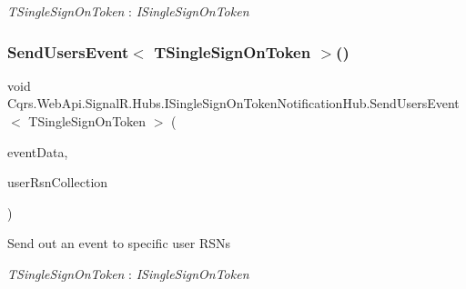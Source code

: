 \begin{Desc}
\item[Type Constraints]\begin{description}
\item[{\em T\+Single\+Sign\+On\+Token} : {\em I\+Single\+Sign\+On\+Token}]\end{description}
\end{Desc}
\mbox{\label{interfaceCqrs_1_1WebApi_1_1SignalR_1_1Hubs_1_1ISingleSignOnTokenNotificationHub_afe5b9561d3844b33e63082420666823e_afe5b9561d3844b33e63082420666823e}} 
\subsubsection{\texorpdfstring{Send\+Users\+Event$<$ T\+Single\+Sign\+On\+Token $>$()}{SendUsersEvent< TSingleSignOnToken >()}}
{\footnotesize\ttfamily void Cqrs.\+Web\+Api.\+Signal\+R.\+Hubs.\+I\+Single\+Sign\+On\+Token\+Notification\+Hub.\+Send\+Users\+Event$<$ T\+Single\+Sign\+On\+Token $>$ (\begin{DoxyParamCaption}\item[{\hyperlink{interfaceCqrs_1_1Events_1_1IEvent}{I\+Event}$<$ T\+Single\+Sign\+On\+Token $>$}]{event\+Data,  }\item[{params Guid \mbox{[}$\,$\mbox{]}}]{user\+Rsn\+Collection }\end{DoxyParamCaption})}



Send out an event to specific user R\+S\+Ns 

\begin{Desc}
\item[Type Constraints]\begin{description}
\item[{\em T\+Single\+Sign\+On\+Token} : {\em I\+Single\+Sign\+On\+Token}]\end{description}
\end{Desc}
